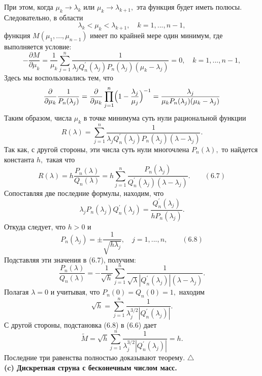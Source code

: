 \documentclass[12 pt, a4 paper]{article}
\theoremstyle{plain}   \newtheorem{Pro}{Задача}
\begin{document}
При этом, когда
$ \mu _k \rightarrow \lambda _k $
или
$ \mu _k \rightarrow \lambda _{k+1} , $
эта функция будет иметь полюсы. Следовательно, в области
$$
  \lambda _k < \mu _k < \lambda _{k+1} ,
    \quad k=1,...,n-1,
$$
функция
$ M(\mu _1 ,...,\mu _{n-1}) $
имеет по крайней мере один минимум, где выполняется условие:
$$
  -\frac{\partial M}{\partial \mu _k}=
    \frac{1}{\mu _k} \sum _{j=1}^n
	  \frac{1}
	    {\lambda _j Q_n ^{\prime}(\lambda _j )
		  P_n (\lambda _j ) (\mu _k -\lambda _j )}=0,
		    \quad k=1,...,n-1,
$$
Здесь мы воспользовались тем, что
$$
  \frac{\partial}{\partial \mu _k}
    \frac{1}{P_n (\lambda _j )} =
	  \frac{\partial}{\partial \mu _k}
	    \prod _{j=1}^n \Bigl ( 1-
		  \frac{\lambda _j}{\mu _j} \Bigr ) ^{-1} =
		    \frac{\lambda _j}{\mu _k P_n (\lambda _j )
			  (\mu _k -\lambda _j )}
$$
Таким образом, числа
$ \mu _k $
в точке минимума суть нули рациональной функции
$$
  R(\lambda )=\sum _{j=1}^n \frac{1}
    {\lambda _j Q_n ^{\prime}(\lambda _j ) P_n (\lambda _j )
	  (\lambda -\lambda _j )}.
$$
Так как, с другой стороны, эти числа суть нули многочлена
$ P_n (\lambda ) , $
то найдется константа
$ h , $
такая что
$$
  R(\lambda )=h\frac{P_n (\lambda )}{Q_n (\lambda )}=
    h \sum _{j=1}^n \frac{P_n (\lambda _j )}
	  {Q_n ^{\prime}(\lambda _j ) (\lambda -\lambda _j )}.
	    \qquad (6.7)
$$
Сопоставляя две последние формулы, находим, что
$$
  \lambda _j P_n (\lambda _j ) Q_n ^{\prime}(\lambda _j ) =
    \frac{Q_n ^{\prime}(\lambda _j )}
	  {h P_n (\lambda _j )}.
$$
Откуда следует, что
$ h>0 $
и
$$
  P_n (\lambda _j )= \pm \frac{1}
    {\sqrt{h \lambda _j}},
	  \quad j=1,...,n,
	    \qquad (6.8)
$$
Подставляя эти значения в (6.7), получим:
$$
  \frac{P_n (\lambda )}{Q_n (\lambda )}=
    -\frac{1}{\sqrt{h}} \sum _{j=1}^n
	  \frac{1}{\sqrt{\lambda}|Q_n ^{\prime}(\lambda _j )|
	    (\lambda -\lambda _j )}.
$$
Полагая
$ \lambda =0 $
и учитывая, что
$ P_n (0) =Q_n (0) =1 , $
находим
$$
  \sqrt{h}=\sum _{j=1}^n \frac{1}
    {\lambda _j ^{3/2} |Q_n ^{\prime}(\lambda _j )|}.
$$
С другой стороны, подстановка (6.8) в (6.6) дает
$$
  \tilde M = \sqrt{h} \sum _{j=1}^n \frac{1}
    {\lambda _j ^{3/2} |Q_n ^{\prime}(\lambda _j )|}=h.
$$
Последние три равенства полностью доказывают теорему.
$ \triangle $
$$ \; $$
{\bfseries (c) Дискретная струна с бесконечным числом масс.} \\
\end{document}
